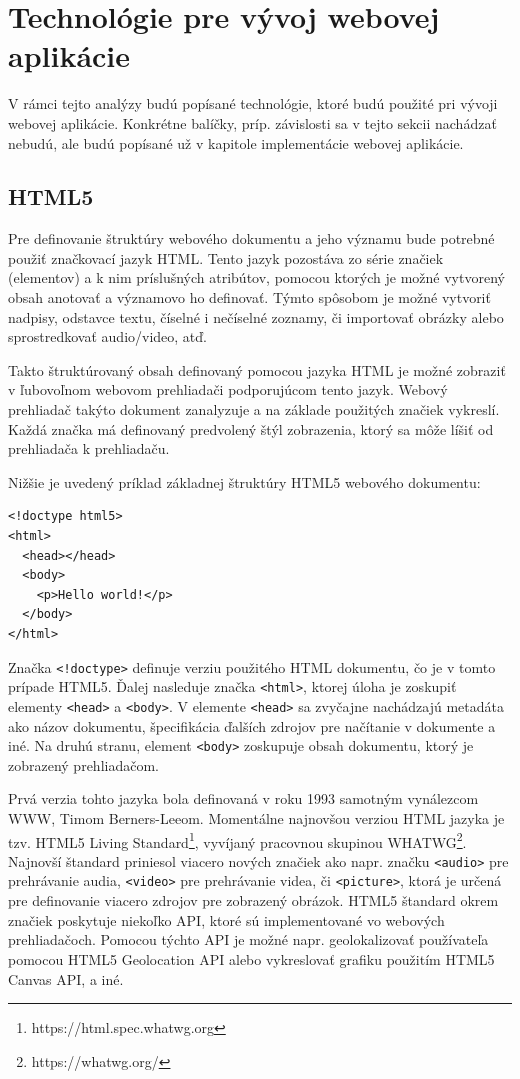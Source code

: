 \clearpage

\section {Technológie pre vývoj webovej aplikácie}
V rámci tejto analýzy budú popísané technológie, ktoré budú použité pri vývoji webovej aplikácie. Konkrétne balíčky, príp. závislosti sa v tejto sekcii nachádzať nebudú, ale budú popísané už v kapitole implementácie webovej aplikácie.

\subsection {HTML5}
Pre definovanie štruktúry webového dokumentu a jeho významu bude potrebné použiť značkovací jazyk HTML. Tento jazyk pozostáva zo série značiek (elementov) a k nim príslušných atribútov, pomocou ktorých je možné vytvorený obsah anotovať a významovo ho definovať. Týmto spôsobom je možné vytvoriť nadpisy, odstavce textu, číselné i nečíselné zoznamy, či importovať obrázky alebo sprostredkovať audio/video, atď.

Takto štruktúrovaný obsah definovaný pomocou jazyka HTML je možné zobraziť v ľubovoľnom webovom prehliadači podporujúcom tento jazyk. Webový prehliadač takýto dokument zanalyzuje a na základe použitých značiek vykreslí. Každá značka má definovaný predvolený štýl zobrazenia, ktorý sa môže líšiť od prehliadača k prehliadaču.

Nižšie je uvedený príklad základnej štruktúry HTML5 webového dokumentu:
\begin{verbatim}
<!doctype html5>
<html>
  <head></head>
  <body>
    <p>Hello world!</p>
  </body>
</html>
\end{verbatim}

Značka \texttt{<!doctype>} definuje verziu použitého HTML dokumentu, čo je v tomto prípade HTML5. Ďalej nasleduje značka \texttt{<html>}, ktorej úloha je zoskupiť elementy \texttt{<head>} a \texttt{<body>}. V elemente \texttt{<head>} sa zvyčajne nachádzajú metadáta ako názov dokumentu, špecifikácia ďalších zdrojov pre načítanie v dokumente a iné. Na druhú stranu, element \texttt{<body>} zoskupuje obsah dokumentu, ktorý je zobrazený prehliadačom.

Prvá verzia tohto jazyka bola definovaná v roku 1993 samotným vynálezcom WWW, Timom Berners-Leeom. Momentálne najnovšou verziou HTML jazyka je tzv. HTML5 Living Standard\footnote{https://html.spec.whatwg.org}, vyvíjaný pracovnou skupinou \newline WHATWG\footnote{https://whatwg.org/}. Najnovší štandard priniesol viacero nových značiek ako napr. značku \texttt{<audio>} pre prehrávanie audia, \texttt{<video>} pre prehrávanie videa, či \texttt{<picture>}, ktorá je určená pre definovanie viacero zdrojov pre zobrazený obrázok. HTML5 štandard okrem značiek poskytuje niekoľko API, ktoré sú implementované vo webových prehliadačoch. Pomocou týchto API je možné napr. geolokalizovať používateľa pomocou HTML5 Geolocation API alebo vykreslovať grafiku použitím HTML5 Canvas API, a iné.

